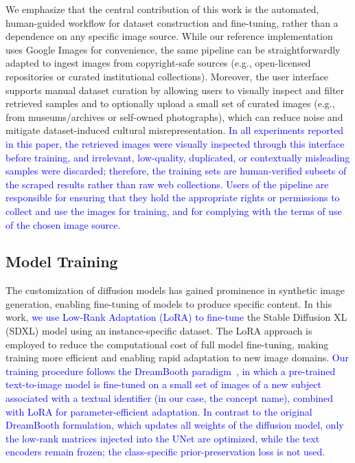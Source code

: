 \documentclass[pdflatex,sn-mathphys-num]{sn-jnl}%
\theoremstyle{thmstyleone}%
\theoremstyle{thmstyletwo}%
\theoremstyle{thmstylethree}%
\begin{document}
We emphasize that the central contribution of this work is the automated, human-guided workflow for dataset construction and fine-tuning, rather than a dependence on any specific image source. While our reference implementation uses Google Images for convenience, the same pipeline can be straightforwardly adapted to ingest images from copyright-safe sources (e.g., open-licensed repositories or curated institutional collections). Moreover, the user interface supports manual dataset curation by allowing users to visually inspect and filter retrieved samples and to optionally upload a small set of curated images (e.g., from museums/archives or self-owned photographs), which can reduce noise and mitigate dataset-induced cultural misrepresentation. \textcolor{blue}{In all experiments reported in this paper, the retrieved images were visually inspected through this interface before training, and irrelevant, low-quality, duplicated, or contextually misleading samples were discarded; therefore, the training sets are human-verified subsets of the scraped results rather than raw web collections. Users of the pipeline are responsible for ensuring that they hold the appropriate rights or permissions to collect and use the images for training, and for complying with the terms of use of the chosen image source.}


\subsection{Model Training}
\label{sec:training}
The customization of diffusion models has gained prominence in synthetic image generation, enabling fine-tuning of models to produce specific content. In this work, \textcolor{blue}{we use Low-Rank Adaptation (LoRA) to fine-tune} the Stable Diffusion XL (SDXL) model using an instance-specific dataset. The LoRA approach is employed to reduce the computational cost of full model fine-tuning, making training more efficient and enabling rapid adaptation to new image domains. \textcolor{blue}{Our training procedure follows the DreamBooth paradigm~\cite{dreambooth}, in which a pre-trained text-to-image model is fine-tuned on a small set of images of a new subject associated with a textual identifier (in our case, the concept name), combined with LoRA for parameter-efficient adaptation. In contrast to the original DreamBooth formulation, which updates all weights of the diffusion model, only the low-rank matrices injected into the UNet are optimized, while the text encoders remain frozen; the class-specific prior-preservation loss is not used.}
\end{document}
